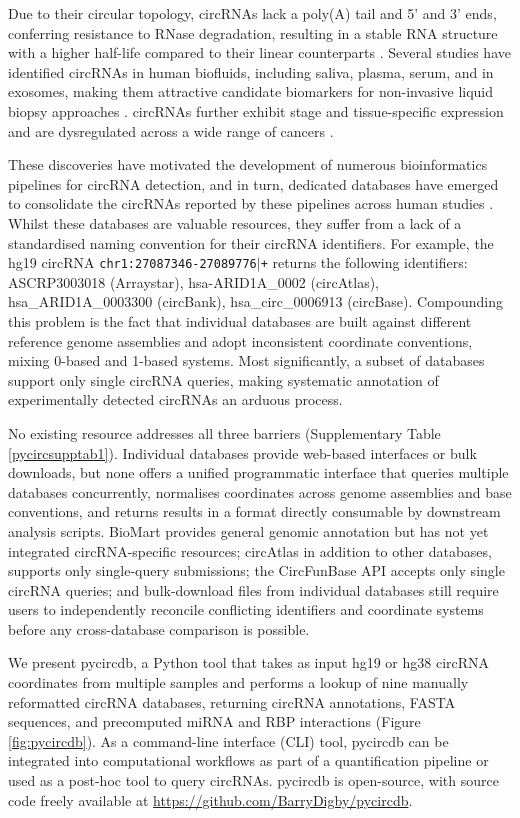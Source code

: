 Due to their circular topology, circRNAs lack a poly(A) tail and 5' and 3' ends, conferring resistance to RNase degradation, resulting in a stable RNA structure with a higher half-life compared to their linear counterparts \cite{Salzman2012}. Several studies have identified circRNAs in human biofluids, including saliva, plasma, serum, and in exosomes, making them attractive candidate biomarkers for non-invasive liquid biopsy approaches \cite{Memczak2015}. circRNAs further exhibit stage and tissue-specific expression \cite{Gruner2016} and are dysregulated across a wide range of cancers \cite{Conn2024Sep}.

These discoveries have motivated the development of numerous bioinformatics pipelines for circRNA detection, and in turn, dedicated databases have emerged to consolidate the circRNAs reported by these pipelines across human studies \cite{Digby2024Dec}. Whilst these databases are valuable resources, they suffer from a lack of a standardised naming convention for their circRNA identifiers. For example, the hg19 circRNA \texttt{chr1:27087346-27089776$\vert$+} returns the following identifiers: ASCRP3003018 (Arraystar), hsa-ARID1A\_0002 (circAtlas), hsa\_ARID1A\_0003300 (circBank), hsa\_circ\_0006913 (circBase). Compounding this problem is the fact that individual databases are built against different reference genome assemblies and adopt inconsistent coordinate conventions, mixing 0-based and 1-based systems. Most significantly, a subset of databases support only single circRNA queries, making systematic annotation of experimentally detected circRNAs an arduous process.

No existing resource addresses all three barriers (Supplementary Table \ref{pycircsupptab1}). Individual databases provide web-based interfaces or bulk downloads, but none offers a unified programmatic interface that queries multiple databases concurrently, normalises coordinates across genome assemblies and base conventions, and returns results in a format directly consumable by downstream analysis scripts. BioMart \cite{biomart} provides general genomic annotation but has not yet integrated circRNA-specific resources; circAtlas \cite{circinteractome} in addition to other databases, supports only single-query submissions; the CircFunBase API accepts only single circRNA queries; and bulk-download files from individual databases still require users to independently reconcile conflicting identifiers and coordinate systems before any cross-database comparison is possible.

We present pycircdb, a Python tool that takes as input hg19 or hg38 circRNA coordinates from multiple samples and performs a lookup of nine manually reformatted circRNA databases, returning circRNA annotations, FASTA sequences, and precomputed miRNA and RBP interactions (Figure \ref{fig:pycircdb}). As a command-line interface (CLI) tool, pycircdb can be integrated into computational workflows as part of a quantification pipeline or used as a post-hoc tool to query circRNAs. pycircdb is open-source, with source code freely available at \href{https://github.com/BarryDigby/pycircdb}{https://github.com/BarryDigby/pycircdb}. 


